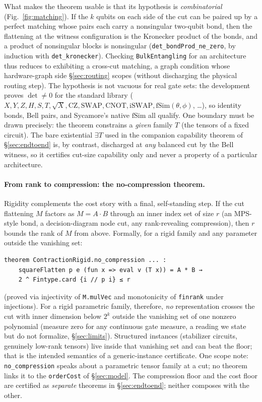 \documentclass[sigplan,10pt,screen,review,anonymous]{acmart}
\begin{document}
What makes the theorem usable is that its hypothesis is \emph{combinatorial}
(Fig.~\ref{fig:matching}). If the $k$ qubits on each side of the cut can be paired up by a
perfect matching whose pairs each carry a nonsingular two-qubit bond, then the flattening
at the witness configuration is the Kronecker product of the bonds, and a product of
nonsingular blocks is nonsingular (\lstinline|det_bondProd_ne_zero|, by induction with
\lstinline|det_kronecker|). Checking \lstinline|BulkEntangling| for an architecture thus
reduces to exhibiting a cross-cut matching, a graph condition whose hardware-graph side
\S\ref{sec:routing} scopes (without discharging the physical routing step). The hypothesis is not vacuous for real gate sets: the
development proves $\det \neq 0$ for the standard library ($X, Y, Z, H, S, T, \sqrt{X},
\mathrm{CZ}, \mathrm{SWAP}, \mathrm{CNOT}, \mathrm{iSWAP}, \mathrm{fSim}(\theta,\phi)$,
\ldots), so identity bonds, Bell pairs, and Sycamore's native $\mathrm{fSim}$ all qualify.
One boundary must be drawn precisely: the theorem constrains a \emph{given} family $T$ (the
tensors of a fixed circuit). The bare existential $\exists T$ used in the companion
capability theorem of
\S\ref{sec:endtoend} is, by contrast, discharged at \emph{any} balanced cut by the Bell
witness, so it certifies cut-size capability only and never a property of a particular
architecture.

\paragraph{From rank to compression: the no-compression theorem.}
Rigidity complements the cost story with a final, self-standing step. If the cut flattening $M$ factors as
$M = A\cdot B$ through an inner index set of size $r$ (an MPS-style bond, a
decision-diagram node cut, any rank-revealing compression), then $r$ bounds the rank of
$M$ from above. Formally, for a rigid family and any parameter outside the vanishing set:

\begin{lstlisting}
theorem ContractionRigid.no_compression ... :
    squareFlatten p e (fun x => eval v (T x)) = A * B →
    2 ^ Fintype.card {i // p i} ≤ r
\end{lstlisting}

\noindent (proved via injectivity of \lstinline|M.mulVec| and monotonicity of
\lstinline|finrank| under injections). For a rigid parametric family, therefore, \emph{no}
representation crosses the cut with inner dimension below $2^k$ outside the vanishing set of
one nonzero polynomial (measure zero for any continuous gate measure, a reading we state
but do not formalize, \S\ref{sec:limits}). Structured instances (stabilizer
circuits, genuinely low-rank tensors) live inside that vanishing set and can beat the
floor; that is the intended semantics of a generic-instance certificate. One
scope note: \lstinline|no_compression| speaks about a parametric tensor family at a cut; no
theorem links it to the \lstinline|orderCost| of \S\ref{sec:model}. The compression floor
and the cost floor are certified as \emph{separate} theorems in \S\ref{sec:endtoend};
neither composes with the other.
\end{document}
